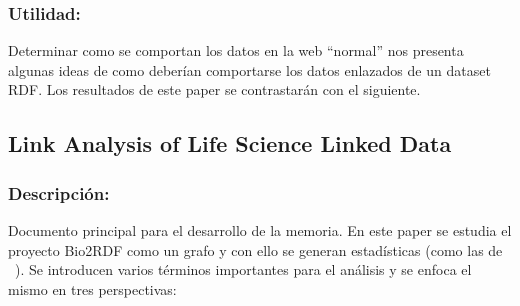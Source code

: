 \documentclass[spanish, fleqn]{article}
\begin{document}
\subsubsection*{Utilidad:}
Determinar como se comportan los datos en la web ``normal'' nos presenta algunas
ideas de como deberían comportarse los datos enlazados de un dataset RDF. Los
resultados de este paper se contrastarán con el siguiente.

\subsection{Link Analysis of Life Science Linked Data\cite{hu2015link}}
\subsubsection*{Descripción:}
Documento principal para el desarrollo de la memoria. En este paper se estudia
el proyecto Bio2RDF como un grafo y con ello se generan estadísticas (como las 
de ~\cite{broder2000graph}). Se introducen varios términos importantes para el
análisis y se enfoca el mismo en tres perspectivas:
\end{document}
